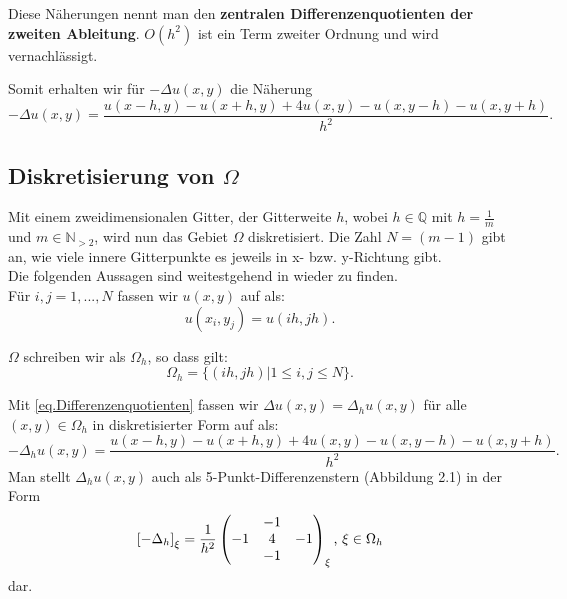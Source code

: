 Diese Näherungen nennt man den \textbf{zentralen Differenzenquotienten der zweiten Ableitung}. $O(h^{2})$ ist ein Term zweiter Ordnung und wird vernachlässigt.

Somit erhalten wir für $-\Delta u(x,y)$ die Näherung
\begin{equation}
-\Delta u(x,y) = \frac {u(x-h,y) - u(x+h,y) + 4u(x,y) - u(x,y-h) - u(x,y+h)} {h^{2}}.\label{eq.Differenzenquotienten}
\end{equation}

\subsection{Diskretisierung von $\Omega$}\label{ss.Diskretisierung}


Mit einem zweidimensionalen Gitter, der Gitterweite $h$, wobei $h \in \mathbb{Q}$ mit $h = \frac {1} {m}$ und $m \in \mathbb{N}_{>2}$, wird nun das Gebiet $\Omega$ diskretisiert. Die Zahl $N = (m-1)$ gibt an, wie viele innere Gitterpunkte es jeweils in x- bzw. y-Richtung gibt.\\
Die folgenden Aussagen sind weitestgehend in \cite{DR1} wieder zu finden.\\

Für $i,j = 1,...,N$ fassen wir $u(x,y)$ auf als:
\begin{equation}
u(x_{i},y_{j}) = u(ih,jh).
\end{equation}

$\Omega$ schreiben wir als $\Omega_{h}$, so dass gilt:
\begin{equation}
\Omega_{h} = \{(ih, jh) | 1 \le i,j \le N\}.
\end{equation}

\label{img.5-Point-Star}

Mit \autoref{eq.Differenzenquotienten} fassen wir $\Delta u(x,y) = \Delta_{h} u(x,y)$ für alle $(x,y) \in \Omega_{h}$ in diskretisierter Form auf als:
\begin{equation}
-\Delta_{h} u(x,y) = \frac {u(x-h,y) - u(x+h,y) + 4u(x,y) - u(x,y-h) - u(x,y+h)} {h^{2}}.\label{eq.5-Point-Star}
\end{equation}
Man stellt $\Delta_{h} u(x,y)$ auch als 5-Punkt-Differenzenstern (Abbildung 2.1) in der Form
\begin{equation}
\left[-\Delta_{h}\right]_{\xi} = \frac {1} {h^{2}}
\begin{pmatrix}
  & -1 & \\
-1 & 4 & -1 \\
  & -1 & 
\end{pmatrix}_{\xi}
\textnormal{, } \xi \in \Omega_{h}
\end{equation}
dar.

